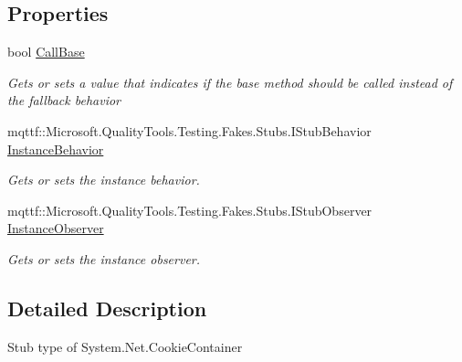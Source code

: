 \subsection*{Properties}
\begin{DoxyCompactItemize}
\item 
bool \hyperlink{class_system_1_1_net_1_1_fakes_1_1_stub_cookie_container_a87b5242525e487ab5fb941f43de864be}{Call\-Base}
\begin{DoxyCompactList}\small\item\em Gets or sets a value that indicates if the base method should be called instead of the fallback behavior\end{DoxyCompactList}\item 
mqttf\-::\-Microsoft.\-Quality\-Tools.\-Testing.\-Fakes.\-Stubs.\-I\-Stub\-Behavior \hyperlink{class_system_1_1_net_1_1_fakes_1_1_stub_cookie_container_aaa7f0548bdda6f329e96b388d3e35435}{Instance\-Behavior}
\begin{DoxyCompactList}\small\item\em Gets or sets the instance behavior.\end{DoxyCompactList}\item 
mqttf\-::\-Microsoft.\-Quality\-Tools.\-Testing.\-Fakes.\-Stubs.\-I\-Stub\-Observer \hyperlink{class_system_1_1_net_1_1_fakes_1_1_stub_cookie_container_a61228a3007cd9e1b1acfc2da9bfd0fa1}{Instance\-Observer}
\begin{DoxyCompactList}\small\item\em Gets or sets the instance observer.\end{DoxyCompactList}\end{DoxyCompactItemize}


\subsection{Detailed Description}
Stub type of System.\-Net.\-Cookie\-Container




